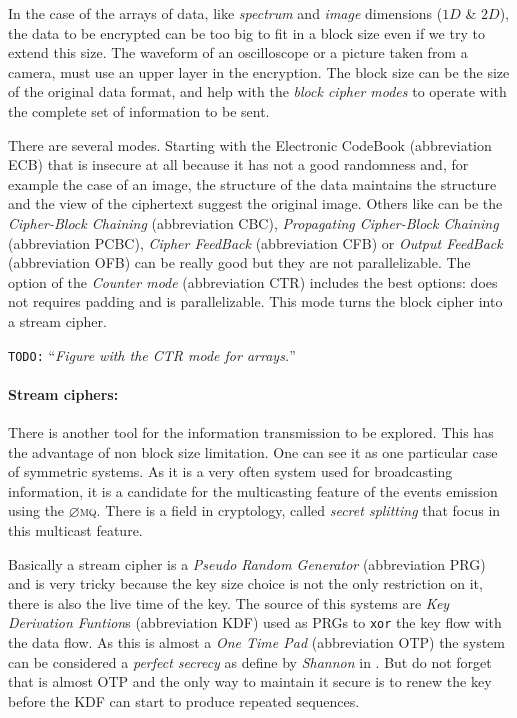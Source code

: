 \documentclass[10pt,a4paper,twoside]{llncs}
\newcommand{\todo}[1]{\texttt{\color{red}TODO:} ``\emph{#1}''}
\newcommand{\zmq}{\textsc{$\varnothing$mq}}
\begin{document}
In the case of the arrays of data, like \emph{spectrum} and \emph{image} dimensions ($1D$ \& $2D$), the data to be encrypted can be too big to fit in a block size even if we try to extend this size. The waveform of an oscilloscope or a picture taken from a camera, must use an upper layer in the encryption. The block size can be the size of the original data format, and help with the \emph{block cipher modes} to operate with the complete set of information to be sent.

There are several modes. Starting with the Electronic CodeBook (abbreviation ECB) that is insecure at all because it has not a good randomness and, for example the case of an image, the structure of the data maintains the structure and the view of the ciphertext suggest the original image. Others like can be the \emph{Cipher-Block Chaining} (abbreviation CBC), \emph{Propagating Cipher-Block Chaining} (abbreviation PCBC), \emph{Cipher FeedBack} (abbreviation CFB) or \emph{Output FeedBack} (abbreviation OFB) can be really good but they are not parallelizable. The option of the \emph{Counter mode} (abbreviation CTR) includes the best options: does not requires padding and is parallelizable. This mode turns the block cipher into a stream cipher.

\todo{Figure with the CTR mode for arrays.}

\paragraph{Stream ciphers:} There is another tool for the information transmission to be explored. This has the advantage of non block size limitation. One can see it as one particular case of symmetric systems. As it is a very often system used for broadcasting information, it is a candidate for the multicasting feature of the events emission using the \zmq. There is a field in cryptology, called \emph{secret splitting} that focus in this multicast feature.

Basically a stream cipher is a \emph{Pseudo Random Generator} (abbreviation PRG) and is very tricky because the key size choice is not the only restriction on it, there is also the live time of the key. The source of this systems are \emph{Key Derivation Funtion}s (abbreviation KDF) used as PRGs to {\tt xor} the key flow with the data flow. As this is almost a \emph{One Time Pad} (abbreviation OTP) the system can be considered a \emph{perfect secrecy} as define by \emph{Shannon} in \cite{shannon-comTheorySecSys}. But do not forget that is almost OTP and the only way to maintain it secure is to renew the key before the KDF can start to produce repeated sequences.
\end{document}

